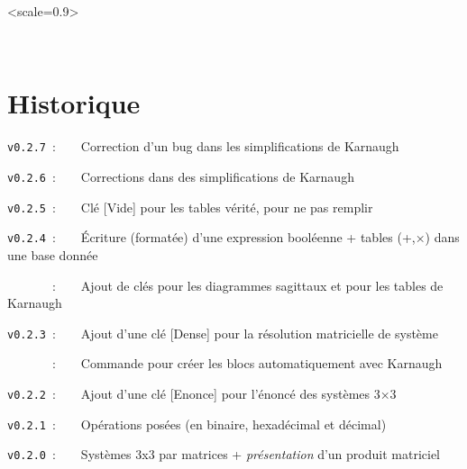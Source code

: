 \documentclass[french,a4paper,11pt]{article}
\providecommand\tikzlogo{Ti\textit{k}Z}
\providecommand\TeXLive{\TeX{}Live\xspace}
\let\TikZ\tikzlogo
\newcommand\TableauDocumentation{%
	\begin{tblr}{width=\linewidth,colspec={X[c]X[c]X[c]X[c]X[c]X[c]},cells={font=\large\sffamily}}
		{\LaTeX} & {\hologo{pdfLaTeX}} & {\hologo{LuaLaTeX}} & {\TikZ} & {\TeXLive} & {\hologo{MiKTeX}} \\
	\end{tblr}
}
\begin{document}
{{\vspace{0.5cm}

\hfill
\begin{GrapheTikz}[Unite=0.75cm,CouleurSommets={gray/blue},Epaisseur={very thick/thick},CouleurFleches=orange]<scale=0.9>
\end{GrapheTikz}
\hfill~
\hfill~


%
%
%
%
%

\newpage

\hypertarget{matoc}{}

\tableofcontents

\vfill

\newpage

\section{Historique}

\verb|v0.2.7|~:~~~~Correction d'un bug dans les simplifications de Karnaugh

\verb|v0.2.6|~:~~~~Corrections dans des simplifications de Karnaugh

\verb|v0.2.5|~:~~~~Clé \textsf{[Vide]} pour les tables vérité, pour ne pas remplir

\verb|v0.2.4|~:~~~~Écriture (formatée) d'une expression booléenne + tables (+,×) dans une base donnée

\verb|      |~:~~~~Ajout de clés pour les diagrammes sagittaux et pour les tables de Karnaugh

\verb|v0.2.3|~:~~~~Ajout d'une clé [Dense] pour la résolution matricielle de système

\verb|      |~:~~~~Commande pour créer les blocs automatiquement avec Karnaugh

\verb|v0.2.2|~:~~~~Ajout d'une clé \textsf{[Enonce]} pour l'énoncé des systèmes 3×3

\verb|v0.2.1|~:~~~~Opérations posées (en binaire, hexadécimal et décimal)

\verb|v0.2.0|~:~~~~Systèmes 3x3 par matrices + \textit{présentation} d'un produit matriciel

}}
\end{document}
